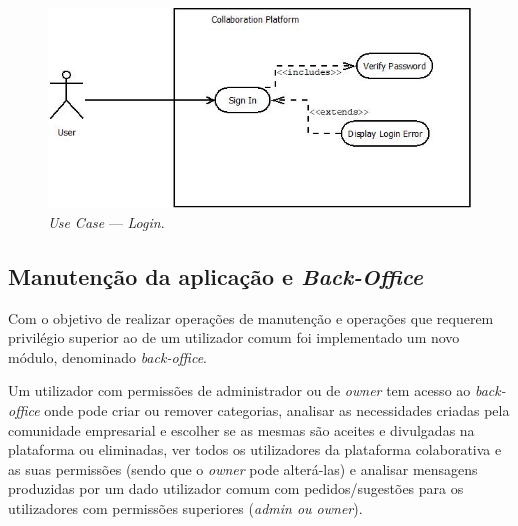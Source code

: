 \begin{figure}[H]
    \centering
    \includegraphics[scale=0.6]{figures/Login Use Case.jpeg}
    \caption{\textit{Use Case} --- \textit{Login}.}\label{fig:uc:login}
\end{figure}

\subsection{Manutenção da aplicação e \textit{Back-Office}}\label{subsec:manutencao_e_back-office}

Com o objetivo de realizar operações de manutenção e operações que requerem privilégio superior ao de um utilizador comum foi implementado um novo módulo, denominado \textit{back-office}. 

\par 
Um utilizador com permissões de administrador ou de \textit{owner} tem acesso ao \textit{back-office} onde pode criar ou remover categorias, analisar as necessidades criadas pela comunidade empresarial e escolher se as mesmas são aceites e divulgadas na plataforma ou eliminadas,
ver todos os utilizadores da plataforma colaborativa e as suas permissões (sendo que o \textit{owner} pode alterá-las) e analisar mensagens produzidas por um dado utilizador comum com pedidos/sugestões para os utilizadores com permissões superiores (\textit{admin ou owner}).  

